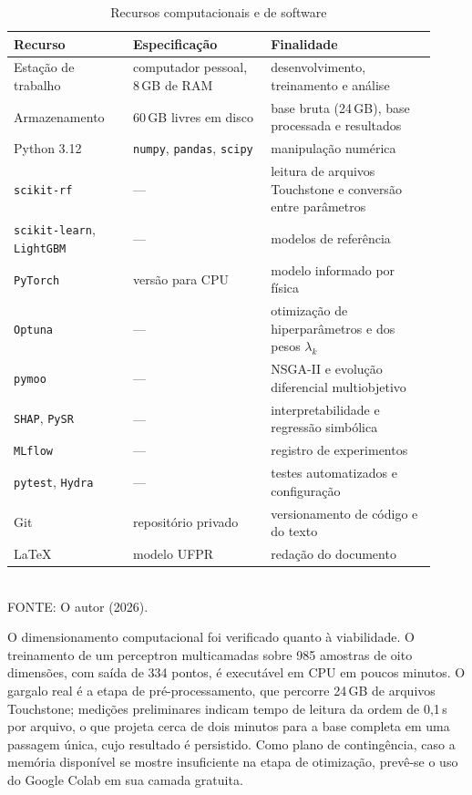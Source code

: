 \begin{table}[htb]
\centering
\caption{Recursos computacionais e de software}
\label{tab:ferramentas}
\footnotesize
\begin{tabular}{@{}p{0.26\linewidth}p{0.30\linewidth}p{0.36\linewidth}@{}}
\toprule
\textbf{Recurso} & \textbf{Especificação} & \textbf{Finalidade} \\
\midrule
Estação de trabalho & computador pessoal, 8\,GB de RAM & desenvolvimento,
treinamento e análise \\[0.3em]
Armazenamento & 60\,GB livres em disco & base bruta (24\,GB), base processada e
resultados \\[0.3em]
Python 3.12 & \texttt{numpy}, \texttt{pandas}, \texttt{scipy} & manipulação
numérica \\[0.3em]
\texttt{scikit-rf} & --- & leitura de arquivos Touchstone e conversão entre
parâmetros \\[0.3em]
\texttt{scikit-learn}, \texttt{LightGBM} & --- & modelos de referência \\[0.3em]
\texttt{PyTorch} & versão para CPU & modelo informado por física \\[0.3em]
\texttt{Optuna} & --- & otimização de hiperparâmetros e dos pesos $\lambda_k$
\\[0.3em]
\texttt{pymoo} & --- & NSGA-II e evolução diferencial multiobjetivo \\[0.3em]
\texttt{SHAP}, \texttt{PySR} & --- & interpretabilidade e regressão simbólica
\\[0.3em]
\texttt{MLflow} & --- & registro de experimentos \\[0.3em]
\texttt{pytest}, \texttt{Hydra} & --- & testes automatizados e configuração
\\[0.3em]
Git & repositório privado & versionamento de código e do texto \\[0.3em]
\LaTeX & modelo UFPR & redação do documento \\
\bottomrule
\end{tabular}
\vspace{0.3em}
\\{\footnotesize FONTE: O autor (2026).}
\end{table}

O dimensionamento computacional foi verificado quanto à viabilidade. O
treinamento de um perceptron multicamadas sobre 985 amostras de oito dimensões,
com saída de 334 pontos, é executável em CPU em poucos minutos. O gargalo real é
a etapa de pré-processamento, que percorre 24\,GB de arquivos Touchstone; medições
preliminares indicam tempo de leitura da ordem de 0{,}1\,s por arquivo, o que
projeta cerca de dois minutos para a base completa em uma passagem única, cujo
resultado é persistido. Como plano de contingência, caso a memória disponível se
mostre insuficiente na etapa de otimização, prevê-se o uso do Google Colab em
sua camada gratuita.

